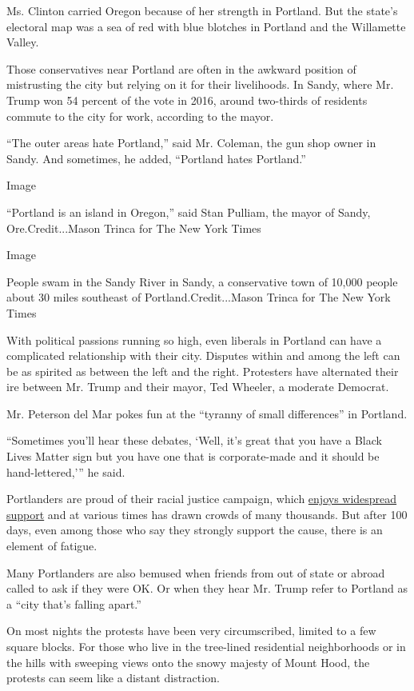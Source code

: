 Ms. Clinton carried Oregon because of her strength in Portland. But the
state's electoral map was a sea of red with blue blotches in Portland
and the Willamette Valley.

Those conservatives near Portland are often in the awkward position of
mistrusting the city but relying on it for their livelihoods. In Sandy,
where Mr. Trump won 54 percent of the vote in 2016, around two-thirds of
residents commute to the city for work, according to the mayor.

``The outer areas hate Portland,'' said Mr. Coleman, the gun shop owner
in Sandy. And sometimes, he added, ``Portland hates Portland.''

Image

``Portland is an island in Oregon,'' said Stan Pulliam, the mayor of
Sandy, Ore.Credit...Mason Trinca for The New York Times

Image

People swam in the Sandy River in Sandy, a conservative town of 10,000
people about 30 miles southeast of Portland.Credit...Mason Trinca for
The New York Times

With political passions running so high, even liberals in Portland can
have a complicated relationship with their city. Disputes within and
among the left can be as spirited as between the left and the right.
Protesters have alternated their ire between Mr. Trump and their mayor,
Ted Wheeler, a moderate Democrat.

Mr. Peterson del Mar pokes fun at the ``tyranny of small differences''
in Portland.

``Sometimes you'll hear these debates, `Well, it's great that you have a
Black Lives Matter sign but you have one that is corporate-made and it
should be hand-lettered,''' he said.

Portlanders are proud of their racial justice campaign, which
\href{https://www.nytimes3xbfgragh.onion/2020/07/24/us/portland-oregon-protests-white-race.html}{enjoys
widespread support} and at various times has drawn crowds of many
thousands. But after 100 days, even among those who say they strongly
support the cause, there is an element of fatigue.

Many Portlanders are also bemused when friends from out of state or
abroad called to ask if they were OK. Or when they hear Mr. Trump refer
to Portland as a ``city that's falling apart.''

On most nights the protests have been very circumscribed, limited to a
few square blocks. For those who live in the tree-lined residential
neighborhoods or in the hills with sweeping views onto the snowy majesty
of Mount Hood, the protests can seem like a distant distraction.

